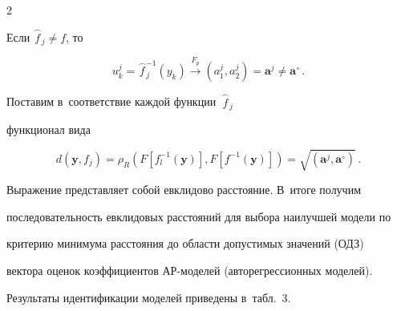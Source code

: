 \begin{multicols}{2}
\begin{center}
{}

\end{center}




\vspace*{3pt}







  

  Если $\overset{\smallfrown}{f}_j\not= f$, то 

  

  \noindent

  $$

  u_k^j= \overset{\smallfrown}{f}_j^{-

1}(y_k)\overset{F_p}{\to} \left( a_1^j, a_2^j\right) = \mathbf{a}^j\not= 

\mathbf{a}^\circ\,.

$$



\vspace*{-9pt}

  

  Поставим в~соответствие каждой функции~$\overset{\smallfrown}{f}_j$ 

функционал вида

  $$

  d(\mathbf{y},f_j) =

  \rho_{{R}} \left( F\left[ f_l^{-1}(\mathbf{y})\right]\!,

 F\left[ f^{-1}(\mathbf{y})\right]\right) =

\sqrt{\left( \mathbf{a}^j, \mathbf{a}^\circ\right)}\,.

  $$ 

  

  Выражение представляет собой евклидово расстояние. В~итоге получим 

последовательность евклидовых расстояний для выбора наилучшей модели по 

критерию минимума расстояния до области допустимых значений (ОДЗ) 

вектора оценок коэффициентов АР-мо\-де\-лей (авторегрессионных моделей). 

Результаты идентификации моделей приведены в~табл.~3.





  








\end{multicols}
